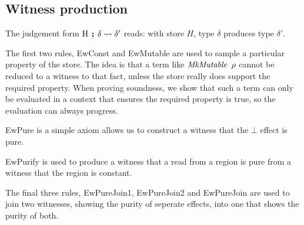 \clearpage{}
\subsection{Witness production}
\label{Core:Simplified:Production}
\bigskip

\bigskip
\bigskip

The judgement form $\textrm{H} \hspace{4pt} \textbf{;} \hspace{4pt} \delta \leadsto \delta'$ reads: with store $H$, type $\delta$ produces type $\delta'$. 

The first two rules, EwConst and EwMutable are used to sample a particular property of the store. The idea is that a term like $\operatorname{\mathit{MkMutable}} \ \rho$ cannot be reduced to a witness to that fact, unless the store really does support the required property. When proving soundness, we show that such a term can only be evaluated in a context that ensures the required property is true, so the evaluation can always progress.

EwPure is a simple axiom allows us to construct a witness that the $\bot$ effect is pure.

EwPurify is used to produce a witness that a read from a region is pure from a witness that the region is constant.

The final three rules, EwPureJoin1, EwPureJoin2 and EwPureJoin are used to join two witnesses, showing the purity of seperate effects, into one that shows the purity of both.
